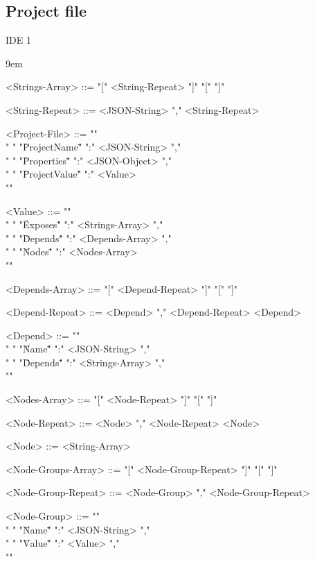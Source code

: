 \subsection{Project file}
\label{sec:protocol-project-file}

{\huge IDE 1}


\grammarindent9em %
\begin{grammar}
<Strings-Array> ::= "[" <String-Repeat>  "]"
              \alt "[" "]"

<String-Repeat> ::= <JSON-String> "," <String-Repeat>

<Project-File> ::= "{" \\
  "  " "\"ProjectName\"" ":" <JSON-String> "," \\
  "  " "\"Properties\"" ":" <JSON-Object> "," \\
  "  " "\"ProjectValue\"" ":" <Value> \\
  "}"

<Value> ::= "{" \\
  "  " "\"Exposes\"" ":" <Strings-Array> "," \\
  "  " "\"Depends\"" ":" <Depends-Array> "," \\
  "  " "\"Nodes\"" ":" <Nodes-Array> \\
  "}"

<Depends-Array> ::= "[" <Depend-Repeat> "]"
                \alt "[" "]"

<Depend-Repeat> ::= <Depend> "," <Depend-Repeat>
                \alt <Depend>

<Depend> ::= "{" \\
  "  " "\"Name\"" ":" <JSON-String> "," \\
  "  " "\"Depends\"" ":" <Strings-Array> "," \\
  "}"

<Nodes-Array> ::= "[" <Node-Repeat> "]"
                \alt "[" "]"

<Node-Repeat> ::= <Node> "," <Node-Repeat>
             \alt <Node>

<Node> ::= <String-Array>

<Node-Groups-Array> ::= "[" <Node-Group-Repeat> "]"
                   \alt "[" "]"

<Node-Group-Repeat> ::= <Node-Group> "," <Node-Group-Repeat>

<Node-Group> ::= "{" \\
  "  " "\"Name\"" ":" <JSON-String> "," \\
  "  " "\"Value\"" ":" <Value> "," \\
  "}"
\end{grammar}

